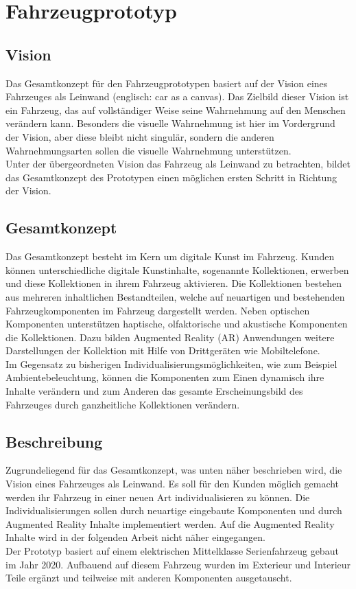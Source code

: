 \chapter{Fahrzeugprototyp}
\label{cha:Prototyp}
\section{Vision}
Das Gesamtkonzept für den Fahrzeugprototypen basiert auf der Vision eines \glqq Fahrzeuges als Leinwand\grqq{} (englisch: \glqq car as a canvas\grqq{}). Das Zielbild dieser Vision ist ein Fahrzeug, das auf vollständiger Weise seine Wahrnehmung auf den Menschen verändern kann. Besonders die visuelle Wahrnehmung ist hier im Vordergrund der Vision, aber diese bleibt nicht singulär, sondern die anderen Wahrnehmungsarten sollen die visuelle Wahrnehmung unterstützen.\\
Unter der übergeordneten Vision das Fahrzeug als Leinwand zu betrachten, bildet das Gesamtkonzept des Prototypen einen möglichen ersten Schritt in Richtung der Vision.
\section{Gesamtkonzept}
Das Gesamtkonzept besteht im Kern um digitale Kunst im Fahrzeug. Kunden können unterschiedliche digitale Kunstinhalte, sogenannte Kollektionen, erwerben und diese Kollektionen in ihrem Fahrzeug aktivieren. Die Kollektionen bestehen aus mehreren inhaltlichen Bestandteilen, welche auf neuartigen und bestehenden Fahrzeugkomponenten im Fahrzeug dargestellt werden. Neben optischen Komponenten unterstützen haptische, olfaktorische und akustische Komponenten die Kollektionen. Dazu bilden Augmented Reality (AR) Anwendungen weitere Darstellungen der Kollektion mit Hilfe von Drittgeräten wie Mobiltelefone.\\
Im Gegensatz zu bisherigen Individualisierungsmöglichkeiten, wie zum Beispiel Ambientebeleuchtung, können die Komponenten zum Einen dynamisch ihre Inhalte verändern und zum Anderen das gesamte Erscheinungsbild des Fahrzeuges durch ganzheitliche Kollektionen verändern. 
\section{Beschreibung} %
Zugrundeliegend für das Gesamtkonzept, was unten näher beschrieben wird, die Vision eines Fahrzeuges als Leinwand. Es soll für den Kunden möglich gemacht werden ihr Fahrzeug in einer neuen Art individualisieren zu können. Die Individualisierungen sollen durch neuartige eingebaute Komponenten und durch Augmented Reality Inhalte implementiert werden. Auf die Augmented Reality Inhalte wird in der folgenden Arbeit nicht näher eingegangen.\\
Der Prototyp basiert auf einem elektrischen Mittelklasse Serienfahrzeug gebaut im Jahr 2020. Aufbauend auf diesem Fahrzeug wurden im Exterieur und Interieur Teile ergänzt und teilweise mit anderen Komponenten ausgetauscht.
